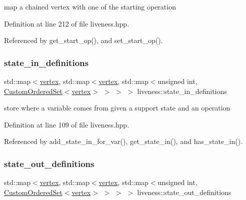 map a chained vertex with one of the starting operation 



Definition at line 212 of file liveness.\+hpp.



Referenced by get\+\_\+start\+\_\+op(), and set\+\_\+start\+\_\+op().

\mbox{\label{classliveness_aaaa2200ef463cbb91af1f689f77e7e4c}} 
\subsubsection{\texorpdfstring{state\+\_\+in\+\_\+definitions}{state\_in\_definitions}}
{\footnotesize\ttfamily std\+::map$<$\hyperlink{graph_8hpp_abefdcf0544e601805af44eca032cca14}{vertex}, std\+::map$<$\hyperlink{graph_8hpp_abefdcf0544e601805af44eca032cca14}{vertex}, std\+::map$<$unsigned int, \hyperlink{classCustomOrderedSet}{Custom\+Ordered\+Set}$<$\hyperlink{graph_8hpp_abefdcf0544e601805af44eca032cca14}{vertex}$>$ $>$ $>$ $>$ liveness\+::state\+\_\+in\+\_\+definitions\hspace{0.3cm}{\ttfamily [private]}}



store where a variable comes from given a support state and an operation 



Definition at line 109 of file liveness.\+hpp.



Referenced by add\+\_\+state\+\_\+in\+\_\+for\+\_\+var(), get\+\_\+state\+\_\+in(), and has\+\_\+state\+\_\+in().

\mbox{\label{classliveness_a282db1a864b07567b4300fc71f6cf4c4}} 
\subsubsection{\texorpdfstring{state\+\_\+out\+\_\+definitions}{state\_out\_definitions}}
{\footnotesize\ttfamily std\+::map$<$\hyperlink{graph_8hpp_abefdcf0544e601805af44eca032cca14}{vertex}, std\+::map$<$\hyperlink{graph_8hpp_abefdcf0544e601805af44eca032cca14}{vertex}, std\+::map$<$unsigned int, \hyperlink{classCustomOrderedSet}{Custom\+Ordered\+Set}$<$\hyperlink{graph_8hpp_abefdcf0544e601805af44eca032cca14}{vertex}$>$ $>$ $>$ $>$ liveness\+::state\+\_\+out\+\_\+definitions\hspace{0.3cm}{\ttfamily [private]}}




